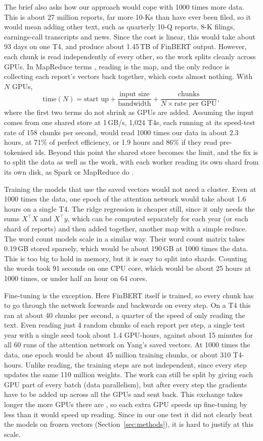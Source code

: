 \documentclass[11pt,a4paper]{article}
\begin{document}
The brief also asks how our approach would cope with 1000 times more data. This is about 27 million reports, far more 10-Ks than have ever been filed, so it would mean adding other text, such as quarterly 10-Q reports, 8-K filings, earnings-call transcripts and news. Since the cost is linear, this would take about 93 days on one T4, and produce about 1.45\,TB of FinBERT output. However, each chunk is read independently of every other, so the work splits cleanly across GPUs. In MapReduce terms \citep{dst092}, reading is the map, and the only reduce is collecting each report's vectors back together, which costs almost nothing. With $N$ GPUs,
\[
  \text{time}(N) = \text{start up} + \frac{\text{input size}}{\text{bandwidth}} + \frac{\text{chunks}}{N \times \text{rate per GPU}},
\]
where the first two terms do not shrink as GPUs are added. Assuming the input comes from one shared store at 1\,GB/s, 1,024 T4s, each running at its speed-test rate of 158 chunks per second, would read 1000 times our data in about 2.3 hours, at 71\% of perfect efficiency, or 1.9 hours and 86\% if they read pre-tokenised ids. Beyond this point the shared store becomes the limit, and the fix is to split the data as well as the work, with each worker reading its own shard from its own disk, as Spark or MapReduce do \citep{dean2004}.

Training the models that use the saved vectors would not need a cluster. Even at 1000 times the data, one epoch of the attention network would take about 1.6 hours on a single T4. The ridge regression is cheaper still, since it only needs the sums $X^\top X$ and $X^\top y$, which can be computed separately for each year (or each shard of reports) and then added together, another map with a simple reduce. The word count models scale in a similar way. Their word count matrix takes 0.19\,GB stored sparsely, which would be about 190\,GB at 1000 times the data. This is too big to hold in memory, but it is easy to split into shards. Counting the words took 91 seconds on one CPU core, which would be about 25 hours at 1000 times, or under half an hour on 64 cores.

Fine-tuning is the exception. Here FinBERT itself is trained, so every chunk has to go through the network forwards and backwards on every step. On a T4 this ran at about 40 chunks per second, a quarter of the speed of only reading the text. Even reading just 4 random chunks of each report per step, a single test year with a single seed took about 1.4 GPU-hours, against about 15 minutes for all 60 runs of the attention network on Yang's saved vectors. At 1000 times the data, one epoch would be about 45 million training chunks, or about 310 T4-hours. Unlike reading, the training steps are not independent, since every step updates the same 110 million weights. The work can still be split by giving each GPU part of every batch (data parallelism), but after every step the gradients have to be added up across all the GPUs and sent back. This exchange takes longer the more GPUs there are \citep{dst092}, so each extra GPU speeds up fine-tuning by less than it would speed up reading. Since in our one test it did not clearly beat the models on frozen vectors (Section~\ref{sec:methods}), it is hard to justify at this scale.
\end{document}
